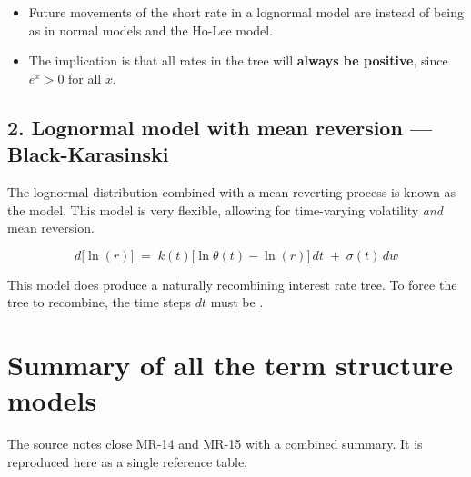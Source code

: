 \begin{mrkeybox}[title={Why this guarantees positive rates}]
\begin{itemize}
\item Future movements of the short rate in a lognormal model are  instead
      of being  as in normal models and the Ho-Lee model.
\item The implication is that all rates in the tree will \textbf{always be positive}, since
      $e^{x} > 0$ for all $x$.
\end{itemize}
\end{mrkeybox}

\subsection{2. Lognormal model with mean reversion --- Black-Karasinski}
The lognormal distribution combined with a mean-reverting process is known as the
 model. This model is very flexible, allowing for time-varying volatility
\textit{and} mean reversion.

\begin{mrfmlbox}
\[ d\bigl[\ln(r)\bigr] \;=\; k(t)\bigl[\ln\theta(t) - \ln(r)\bigr]\,dt \;+\; \sigma(t)\,dw \]
\end{mrfmlbox}

\begin{mrtrapbox}
This model does  produce a naturally recombining interest rate tree. To force the tree
to recombine, the time steps $dt$ must be .
\end{mrtrapbox}

\clearpage
\section{Summary of all the term structure models}

The source notes close MR-14 and MR-15 with a combined summary. It is reproduced here as a
single reference table.

